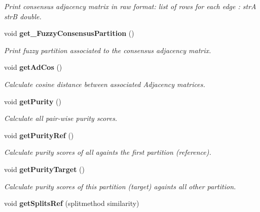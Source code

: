 \begin{CompactItemize}
\begin{CompactList}\small\item\em Print consensus adjacency matrix in raw format: list of rows for each edge : str\-A str\-B double. \item\end{CompactList}\item 
void {\bf get\_\-Fuzzy\-Consensus\-Partition} ()\label{classPartitionStats_a17}

\begin{CompactList}\small\item\em Print fuzzy partition associated to the consensus adjacency matrix. \item\end{CompactList}\item 
void {\bf get\-Ad\-Cos} ()\label{classPartitionStats_a18}

\begin{CompactList}\small\item\em Calculate cosine distance between associated Adjacency matrices. \item\end{CompactList}\item 
void {\bf get\-Purity} ()\label{classPartitionStats_a19}

\begin{CompactList}\small\item\em Calculate all pair-wise purity scores. \item\end{CompactList}\item 
void {\bf get\-Purity\-Ref} ()\label{classPartitionStats_a20}

\begin{CompactList}\small\item\em Calculate purity scores of all againts the first partition (reference). \item\end{CompactList}\item 
void {\bf get\-Purity\-Target} ()\label{classPartitionStats_a21}

\begin{CompactList}\small\item\em Calculate purity scores of this partition (target) againts all other partition. \item\end{CompactList}\item 
void {\bf get\-Splits\-Ref} (splitmethod similarity)\label{classPartitionStats_a22}


\end{CompactItemize}
